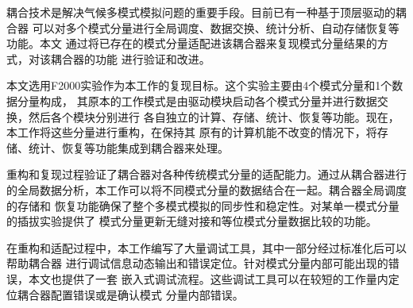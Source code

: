 
\begin{cabstract}
  耦合技术是解决气候多模式模拟问题的重要手段。目前已有一种基于顶层驱动的耦合器
  可以对多个模式分量进行全局调度、数据交换、统计分析、自动存储恢复等功能。本文
  通过将已存在的模式分量适配进该耦合器来复现模式分量结果的方式，对该耦合器的功能
  进行验证和改进。
  
  本文选用F2000实验作为本工作的复现目标。这个实验主要由4个模式分量和1个数据分量构成，
  其原本的工作模式是由驱动模块启动各个模式分量并进行数据交换，然后各个模块分别进行
  各自独立的计算、存储、统计、恢复等功能。现在，本工作将这些分量进行重构，在保持其
  原有的计算机能不改变的情况下，将存储、统计、恢复等功能集成到耦合器来处理。

  重构和复现过程验证了耦合器对各种传统模式分量的适配能力。通过从耦合器进行
  的全局数据分析，本工作可以将不同模式分量的数据结合在一起。耦合器全局调度的存储和
  恢复功能确保了整个多模式模拟的同步性和稳定性。对某单一模式分量的插拔实验提供了
  模式分量更新无缝对接和等位模式分量数据比较的功能。

  在重构和适配过程中，本工作编写了大量调试工具，其中一部分经过标准化后可以帮助耦合器
  进行调试信息动态输出和错误定位。针对模式分量内部可能出现的错误，本文也提供了一套
  嵌入式调试流程。这些调试工具可以在较短的工作量内定位耦合器配置错误或是确认模式
  分量内部错误。

\end{cabstract}

